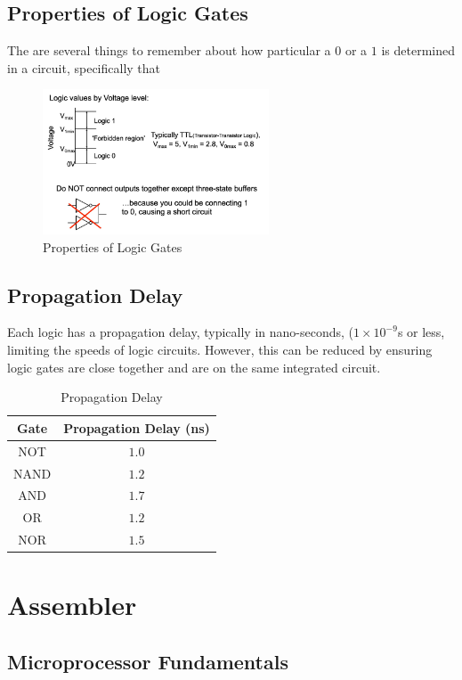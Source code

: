 \documentclass[a4paper]{article}
\theoremstyle{plain}
\theoremstyle{definition}
\theoremstyle{remark}
\begin{document}
\subsection{Properties of Logic Gates}
The are several things to remember about how particular a $0$ or a $1$ is determined in a circuit, specifically that
\begin{figure}[H]
	\centering
	\includegraphics[width=0.6\textwidth]{figures/rules.png}
	\caption{Properties of Logic Gates}
	\label{fig:figures-rules-png}
\end{figure}
\subsection{Propagation Delay}
Each logic has a propagation delay, typically in nano-seconds, ($1 \times 10 ^{-9}$s or less, limiting the speeds of logic circuits. However, this can be reduced by ensuring logic gates are close together and are on the same integrated circuit.
\begin{table}[H]
	\centering
	\caption{Propagation Delay}
	\label{tab:delay}
	\begin{tabular}{c|c}
		Gate & Propagation Delay (ns) \\
		\hline
		NOT & $1.0$ \\
		NAND & $1.2$ \\
		AND & $1.7$ \\
		OR & $1.2$ \\
		NOR & $1.5$ \\
		\hline
	\end{tabular}
\end{table}
\section{Assembler}
\subsection{Microprocessor Fundamentals}
\end{document}

